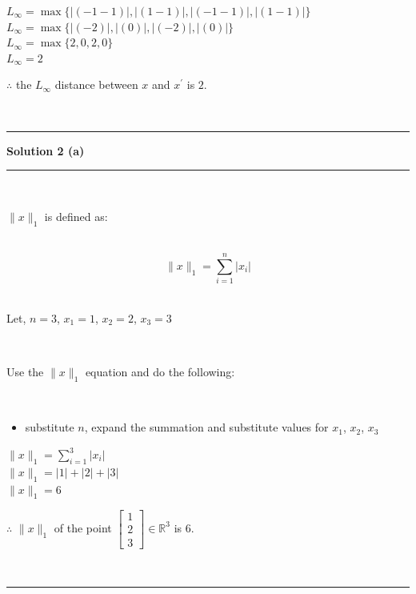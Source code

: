 \documentclass{article}
\begin{document}
$L_{\infty} = \max\{|(-1 - 1)|, |(1 - 1)|, |(-1 - 1)|, |(1 - 1)|\}$\\

$L_{\infty} = \max\{|(-2)|, |(0)|, |(-2)|, |(0)|\}$\\

$L_{\infty} = \max\{2, 0, 2, 0\}$\\

$L_{\infty} = 2$\\

\parbox{\textwidth}{$\therefore$ the $L_{\infty}$ distance between $x$ and $x^{\prime}$ is $2$.}\\


\noindent\rule{\textwidth}{0.4pt}

\newpage

\textbf{Solution 2 (a)}

\noindent\rule{\textwidth}{0.4pt}\\

\parbox{\textwidth}{$\|x\|_1$ is defined as:}\\

$$\|x\|_1 = \sum_{i=1}^{n} |x_i|$$\\

\parbox{\textwidth}{Let, $n=3$, $x_1 = 1$, $x_2 = 2$, $x_3 = 3$}\\

\parbox{\textwidth}{Use the $\|x\|_1$ equation and do the following:}\\

\begin{itemize}
    \item {substitute $n$, expand the summation and substitute values for $x_1$, $x_2$, $x_3$}
\end{itemize}

$\|x\|_1 = \sum_{i=1}^{3} |x_i|$\\

$\|x\|_1 = |1| + |2| + |3|$\\

$\|x\|_1 = 6$\\

\parbox{\textwidth}{$\therefore$ $\|x\|_1$ of the point $\begin{bmatrix} 1 \\ 2 \\ 3 \end{bmatrix} \in \mathbb{R}^3$ is $6$.}\\

\noindent\rule{\textwidth}{0.4pt}\\
\end{document}
